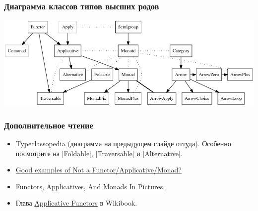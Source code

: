 \documentclass[11pt]{beamer}
\begin{document}
\begin{frame}[fragile]
  \frametitle{Диаграмма классов типов высших родов}
  \includegraphics[width=\linewidth]{Typeclassopedia-diagram.png}
\end{frame}

%

\begin{frame}[fragile]
  \frametitle{Дополнительное чтение}
  \begin{itemize}
    \item \href{https://wiki.haskell.org/Typeclassopedia}{Typeclassopedia} (диаграмма на предыдущем слайде оттуда). Особенно посмотрите на \haskinline|Foldable|, \haskinline|Traversable| и \haskinline|Alternative|.
    \item \href{https://stackoverflow.com/questions/7220436/good-examples-of-not-a-functor-functor-applicative-monad}{Good examples of Not a Functor/Applicative/Monad?}
    \item     \href{http://adit.io/posts/2013-04-17-functors,_applicatives,_and_monads_in_pictures.html}{Functors, Applicatives, And Monads In Pictures.}
    \item Глава \href{https://en.wikibooks.org/wiki/Haskell/Applicative_functors}{Applicative Functors} в Wikibook.
  \end{itemize}
\end{frame}
\end{document}
